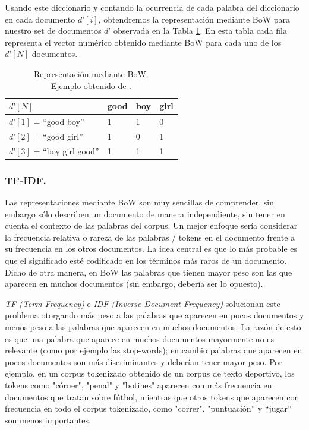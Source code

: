 \documentclass[12pt,a4paper]{article}
\begin{document}
\begin{sloppypar}
Usando este diccionario y contando la ocurrencia de cada palabra del diccionario en cada documento $d’[i]$, obtendremos la representación mediante BoW para nuestro set de documentos $d’$ observada en la Tabla \ref{table:bow_3}. En esta tabla cada fila representa el vector numérico obtenido mediante BoW para cada uno de los $d’[N]$ documentos.

\begin{table}[h!]
\centering
\begin{tabular}{|p{5cm}||p{1cm}|p{1cm}|p{1cm}|}
\hline
\centering $d’[N]$ & \textbf{good} & \textbf{boy} & \textbf{girl} \\ [1ex]
\hline
$d’[1]$ = ``good boy'' & 1 & 1 & 0 \\
\hline
$d’[2]$ = ``good girl'' & 1 & 0 & 1 \\
\hline
$d’[3]$ = ``boy girl good'' & 1 & 1 & 1 \\
\hline
\end{tabular}
\caption{Representación mediante BoW.\\ Ejemplo obtenido de \cite{NLP_2}.} 
\label{table:bow_3}
\end{table}

\subsubsection{TF-IDF.}\label{tf_idf}

Las representaciones mediante BoW son muy sencillas de comprender, sin embargo sólo describen un documento de manera independiente, sin tener en cuenta el contexto de las palabras del corpus. Un mejor enfoque sería considerar la frecuencia relativa o rareza de las palabras / tokens en el documento frente a su frecuencia en los otros documentos. La idea central es que lo más probable es que el significado esté codificado en los términos más raros de un documento. Dicho de otra manera, en BoW las palabras que tienen mayor peso son las que aparecen en muchos documentos (sin embargo, debería ser lo opuesto). 

\textit{TF (Term Frequency)} e \textit{IDF (Inverse Document Frequency)} solucionan este problema otorgando más peso a las palabras que aparecen en pocos documentos y menos peso a las palabras que aparecen en muchos documentos. La razón de esto es que una palabra que aparece en muchos documentos mayormente no es relevante (como por ejemplo las stop-words); en cambio palabras que aparecen en pocos documentos son más discriminantes y deberían tener mayor peso.  Por ejemplo, en un corpus tokenizado obtenido de un corpus de texto deportivo, los tokens como "córner", "penal" y "botines" aparecen con más frecuencia en documentos que tratan sobre fútbol, mientras que otros tokens que aparecen con frecuencia en todo el corpus tokenizado, como "correr", "puntuación” y “jugar” son menos importantes\cite{NLP_7}.


\end{sloppypar}
\end{document}
